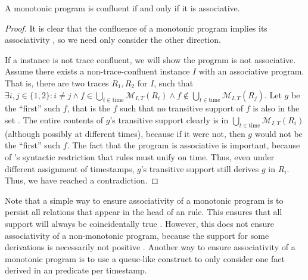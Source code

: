 \begin{lemma}
%
A monotonic \lang program is confluent if and only if it is associative.
%
\end{lemma}
%
\begin{proof}
%
It is clear that the confluence of a monotonic \lang program implies its
associativity , so we need only consider the other direction.

If a \lang instance is not trace confluent, we will show the \lang program is
not associative.  Assume there exists a non-trace-confluent \lang instance $I$
with an associative program.  
That is, there are two traces $R_1, R_2$ for $I$,
such that 
$\exists i,j \in \{1,2\}: i \neq j \land f \in \bigcup_{t \in \text{time}}
\mathcal{M}_{I,T}(R_i) \land f \not\in \bigcup_{t \in \text{time}}
\mathcal{M}_{I,T}(R_j)$.  
Let $g$ be the ``first'' such $f$, that is the $f$
such that no transitive support of $f$ is also in the set .  The entire contents of $g$'s transitive
support clearly is in $\bigcup_{t \in \text{time}} \mathcal{M}_{I,T}(R_i)$
 (although possibly at different times), because if it were not,
then $g$ would not be the ``first'' such $f$.  The fact that the program is
associative is important, because of \lang's syntactic restriction that rules
must unify on time.  Thus, even under different assignment of timestamps, $g$'s
transitive support still derives $g$ in $R_i$.  Thus, we have reached a
contradiction.  
%
\end{proof}

Note that a simple way to ensure associativity of a monotonic program is to
persist all relations that appear in the head of an  rule.  
This ensures that all support will always be coincidentally true .  However,
this does not ensure associativity of a non-monotonic program, because the
support for some derivations is necessarily not positive .  
Another way to ensure associativity of a monotonic program is to use a
queue-like construct to only consider one fact derived in an 
predicate per timestamp.  

